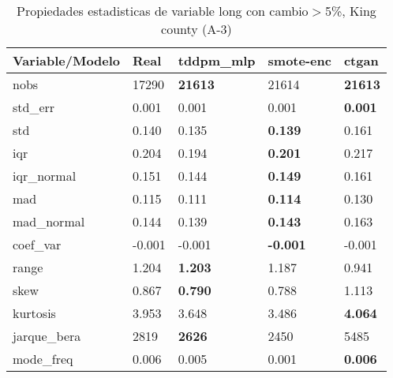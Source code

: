 \begin{table}[H]
\centering
\fontsize{8}{14}\selectfont
\caption{Propiedades estadisticas de variable long con cambio\ensuremath{>}5\%, King county (A-3)}
\label{table-stats-king county-a-3-long-short}
\begin{tabular}{|l|m{10em}|m{10em}|m{10em}|m{10em}|}
\hline
 \rowcolor[gray]{0.8}
Variable/Modelo & Real & tddpm\_mlp & smote-enc & ctgan \\
\hline nobs & 17290 & \bfseries 21613 & \cellcolor[rgb]{0.9, 0.54, 0.52} 21614 & \bfseries 21613 \\
\hline std\_err & 0.001 & \cellcolor[rgb]{0.9, 0.54, 0.52} 0.001 & 0.001 & \bfseries 0.001 \\
\hline std & 0.140 & 0.135 & \bfseries 0.139 & \cellcolor[rgb]{0.9, 0.54, 0.52} 0.161 \\
\hline iqr & 0.204 & 0.194 & \bfseries 0.201 & \cellcolor[rgb]{0.9, 0.54, 0.52} 0.217 \\
\hline iqr\_normal & 0.151 & 0.144 & \bfseries 0.149 & \cellcolor[rgb]{0.9, 0.54, 0.52} 0.161 \\
\hline mad & 0.115 & 0.111 & \bfseries 0.114 & \cellcolor[rgb]{0.9, 0.54, 0.52} 0.130 \\
\hline mad\_normal & 0.144 & 0.139 & \bfseries 0.143 & \cellcolor[rgb]{0.9, 0.54, 0.52} 0.163 \\
\hline coef\_var & -0.001 & -0.001 & \bfseries -0.001 & \cellcolor[rgb]{0.9, 0.54, 0.52} -0.001 \\
\hline range & 1.204 & \bfseries 1.203 & 1.187 & \cellcolor[rgb]{0.9, 0.54, 0.52} 0.941 \\
\hline skew & 0.867 & \bfseries 0.790 & 0.788 & \cellcolor[rgb]{0.9, 0.54, 0.52} 1.113 \\
\hline kurtosis & 3.953 & 3.648 & \cellcolor[rgb]{0.9, 0.54, 0.52} 3.486 & \bfseries 4.064 \\
\hline jarque\_bera & 2819 & \bfseries 2626 & 2450 & \cellcolor[rgb]{0.9, 0.54, 0.52} 5485 \\
\hline mode\_freq & 0.006 & 0.005 & \cellcolor[rgb]{0.9, 0.54, 0.52} 0.001 & \bfseries 0.006 \\
\hline
\end{tabular}
\end{table}
